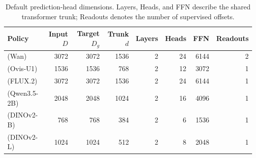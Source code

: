 \begin{table}[htbp]
\vspace{-2mm}
\caption{Default prediction-head dimensions. Layers, Heads, and FFN describe the shared transformer trunk; Readouts denotes the number of supervised offsets.}

\label{tab:headdims}
\begin{center}
\small\setlength{\tabcolsep}{5pt}
\begin{tabular}{@{}lrrrrrrr@{}}
\toprule
Policy & Input $D$ & Target $D_g$ & Trunk $d$ & Layers & Heads & FFN & Readouts \\
\midrule
\modelname{} (Wan) & 3072 & 3072 & 1536 & 2 & 24 & 6144 & 2 \\
\modelname{} (Ovis-U1) & 1536 & 1536 & 768 & 2 & 12 & 3072 & 1 \\
\modelname{} (FLUX.2) & 3072 & 3072 & 1536 & 2 & 24 & 6144 & 1 \\
\modelname{} (Qwen3.5-2B) & 2048 & 2048 & 1024 & 2 & 16 & 4096 & 1 \\
\modelname{} (DINOv2-B) & 768 & 768 & 384 & 2 & 6 & 1536 & 1 \\
\modelname{} (DINOv2-L) & 1024 & 1024 & 512 & 2 & 8 & 2048 & 1 \\
\bottomrule
\end{tabular}
\end{center}
\vspace{-2mm}
\end{table}
